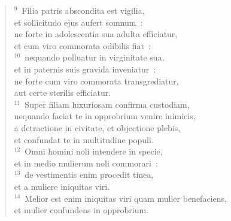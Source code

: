 \begin{verse}${}^{9}$~Filia patris abscondita est vigilia,\\ et sollicitudo ejus aufert somnum~:\\ ne forte in adolescentia sua adulta efficiatur,\\ et cum viro commorata odibilis fiat~:\\
${}^{10}$~nequando polluatur in virginitate sua,\\ et in paternis suis gravida inveniatur~:\\ ne forte cum viro commorata transgrediatur,\\ aut certe sterilis efficiatur.\\
${}^{11}$~Super filiam luxuriosam confirma custodiam,\\ nequando faciat te in opprobrium venire inimicis,\\ a detractione in civitate, et objectione plebis,\\ et confundat te in multitudine populi.\\
${}^{12}$~Omni homini noli intendere in specie,\\ et in medio mulierum noli commorari~:\\
${}^{13}$~de vestimentis enim procedit tinea,\\ et a muliere iniquitas viri.\\
${}^{14}$~Melior est enim iniquitas viri quam mulier benefaciens,\\ et mulier confundens in opprobrium.\end{verse}


